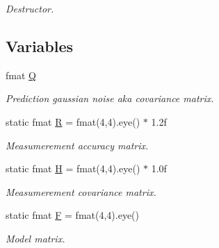 \begin{DoxyCompactItemize}
\begin{DoxyCompactList}\small\item\em Destructor. \end{DoxyCompactList}\end{DoxyCompactItemize}
\subsection*{Variables}
\begin{DoxyCompactItemize}
\item 
fmat \hyperlink{group__laser__object__t_ga4a44e170a3630aad3356b3682684f6c8}{Q}\hypertarget{group__laser__object__t_ga4a44e170a3630aad3356b3682684f6c8}{}\label{group__laser__object__t_ga4a44e170a3630aad3356b3682684f6c8}

\begin{DoxyCompactList}\small\item\em Prediction gaussian noise aka covariance matrix. \end{DoxyCompactList}\item 
static fmat \hyperlink{group__laser__object__t_ga77bf685edecf60761abb55a23d9c9a9b}{R} = fmat(4,4).eye() $\ast$ 1.\+2f\hypertarget{group__laser__object__t_ga77bf685edecf60761abb55a23d9c9a9b}{}\label{group__laser__object__t_ga77bf685edecf60761abb55a23d9c9a9b}

\begin{DoxyCompactList}\small\item\em Measumerement accuracy matrix. \end{DoxyCompactList}\item 
static fmat \hyperlink{group__laser__object__t_gadf0b44b0795b5c94956f21a9fb6c199b}{H} = fmat(4,4).eye() $\ast$ 1.\+0f\hypertarget{group__laser__object__t_gadf0b44b0795b5c94956f21a9fb6c199b}{}\label{group__laser__object__t_gadf0b44b0795b5c94956f21a9fb6c199b}

\begin{DoxyCompactList}\small\item\em Measumerement covariance matrix. \end{DoxyCompactList}\item 
static fmat \hyperlink{group__laser__object__t_ga2c9979ba8b6f6b1b92cb6432c0be9087}{F} = fmat(4,4).eye()\hypertarget{group__laser__object__t_ga2c9979ba8b6f6b1b92cb6432c0be9087}{}\label{group__laser__object__t_ga2c9979ba8b6f6b1b92cb6432c0be9087}

\begin{DoxyCompactList}\small\item\em Model matrix. \end{DoxyCompactList}\end{DoxyCompactItemize}


